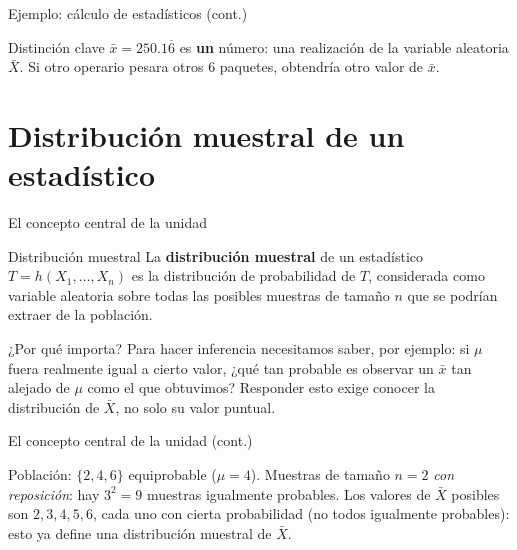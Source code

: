 \documentclass[aspectratio=169,11pt]{beamer}
\begin{document}
\begin{frame}{Ejemplo: cálculo de estadísticos (cont.)}
\begin{block}{Distinción clave}
$\bar x = 250.1\overline{6}$ es \textbf{un} número: una realización de la variable aleatoria $\bar X$. Si otro operario pesara otros 6 paquetes, obtendría otro valor de $\bar x$.
\end{block}
\end{frame}

\section{Distribución muestral de un estadístico}

\begin{frame}{El concepto central de la unidad}
\begin{alertblock}{Distribución muestral}
La \textbf{distribución muestral} de un estadístico $T=h(X_1,\dots,X_n)$ es la distribución de probabilidad de $T$, considerada como variable aleatoria sobre todas las posibles muestras de tamaño $n$ que se podrían extraer de la población.
\end{alertblock}

\begin{block}{¿Por qué importa?}
Para hacer inferencia necesitamos saber, por ejemplo: si $\mu$ fuera realmente igual a cierto valor, ¿qué tan probable es observar un $\bar x$ tan alejado de $\mu$ como el que obtuvimos? Responder esto exige conocer la distribución de $\bar X$, no solo su valor puntual.
\end{block}

\end{frame}

\begin{frame}{El concepto central de la unidad (cont.)}
\begin{example}
Población: $\{2,4,6\}$ equiprobable ($\mu=4$). Muestras de tamaño $n=2$ \emph{con reposición}: hay $3^2=9$ muestras igualmente probables. Los valores de $\bar X$ posibles son $2,3,4,5,6$, cada uno con cierta probabilidad (no todos igualmente probables): esto ya define una distribución muestral de $\bar X$.
\end{example}
\end{frame}
\end{document}
